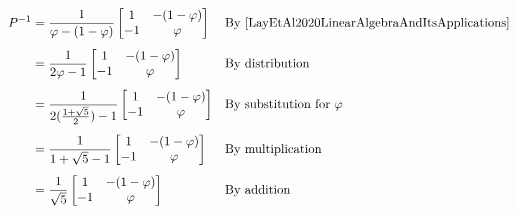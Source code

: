 \documentclass{article}
\newcommand{\reason}[1]{&& \text{#1}}
\begin{document}
\begin{enumerate}
        \begin{align*}
          P^{-1} & = \frac{1}{\varphi - (1 - \varphi)}\begin{bmatrix}
                                                        1  & -(1-\varphi) \\
                                                        -1 & \varphi
                                                      \end{bmatrix} \reason{By \cite[Theorem~2.4, p.~112]{LayEtAl2020LinearAlgebraAndItsApplications}} \\[1ex]
                 & = \frac{1}{2\varphi - 1}\begin{bmatrix}
                                             1  & -(1-\varphi) \\
                                             -1 & \varphi
                                           \end{bmatrix} \reason{By distribution}                                                                      \\[1ex]
                 & = \frac{1}{2(\frac{1 + \sqrt{5}}{2}) - 1}\begin{bmatrix}
                                                              1  & -(1-\varphi) \\
                                                              -1 & \varphi
                                                            \end{bmatrix} \reason{By substitution for $\varphi$}                                       \\[1ex]
                 & = \frac{1}{1 + \sqrt{5} - 1}\begin{bmatrix}
                                                 1  & -(1-\varphi) \\
                                                 -1 & \varphi
                                               \end{bmatrix} \reason{By multiplication}                                                                \\[1ex]
                 & = \frac{1}{\sqrt{5}}\begin{bmatrix}
                                         1  & -(1-\varphi) \\
                                         -1 & \varphi
                                       \end{bmatrix} \reason{By addition}
        \end{align*}


\end{enumerate}
\end{document}
